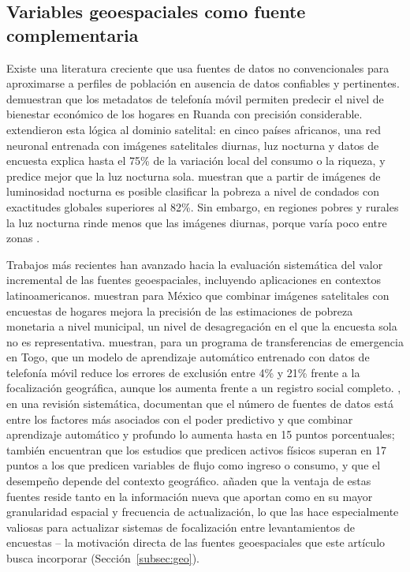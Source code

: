 \documentclass[12pt, letterpaper]{article}
\begin{document}
\subsection{Variables geoespaciales como fuente complementaria}
\label{subsec:geoespacial}

Existe una literatura creciente que usa fuentes de datos no convencionales
para aproximarse a perfiles de población en ausencia de datos confiables y
pertinentes. \textcite{blumenstock2015} demuestran que los metadatos de
telefonía móvil permiten predecir el nivel de bienestar económico de los
hogares en Ruanda con precisión considerable. \textcite{jean2016}
extendieron esta lógica al dominio satelital: en cinco países africanos,
una red neuronal entrenada con imágenes satelitales diurnas, luz nocturna
y datos de encuesta explica hasta el 75\% de la variación local del
consumo o la riqueza, y predice mejor que la luz nocturna sola.
\textcite{li2019} muestran que a partir de imágenes de luminosidad
nocturna es posible clasificar la pobreza a nivel de condados con
exactitudes globales superiores al 82\%. Sin embargo, en regiones pobres
y rurales la luz nocturna rinde menos que las imágenes diurnas, porque
varía poco entre zonas \parencite{hall2023}.

Trabajos más recientes han avanzado hacia la evaluación sistemática del
valor incremental de las fuentes geoespaciales, incluyendo aplicaciones en
contextos latinoamericanos. \textcite{newhouse2025} muestran para México
que combinar imágenes satelitales con encuestas de hogares mejora la
precisión de las estimaciones de pobreza monetaria a nivel municipal, un
nivel de desagregación en el que la encuesta sola no es representativa.
\textcite{aiken2022} muestran, para un programa de transferencias de
emergencia en Togo, que un modelo de aprendizaje automático entrenado con
datos de telefonía móvil reduce los errores de exclusión entre 4\% y 21\%
frente a la focalización geográfica, aunque los aumenta frente a un
registro social completo. \textcite{hall2023},
en una revisión sistemática, documentan que el número de fuentes de datos
está entre los factores más asociados con el poder predictivo y que
combinar aprendizaje automático y profundo lo aumenta hasta en 15 puntos
porcentuales; también encuentran que los estudios que predicen activos
físicos superan en 17 puntos a los que predicen variables de flujo como
ingreso o consumo, y que el desempeño depende del contexto geográfico. \textcite{hofer2025} añaden
que la ventaja de estas fuentes reside tanto en la información nueva que
aportan como en su mayor granularidad espacial y frecuencia de
actualización, lo que las hace especialmente valiosas para actualizar
sistemas de focalización entre levantamientos de encuestas -- la
motivación directa de las fuentes geoespaciales que este artículo busca
incorporar (Sección~\ref{subsec:geo}).
\end{document}

